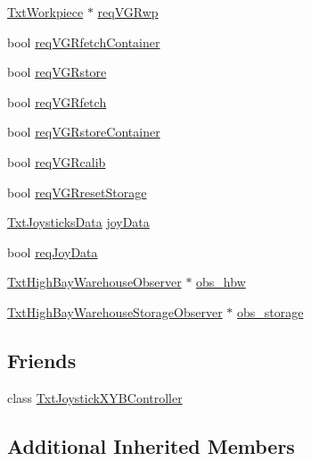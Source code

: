 \begin{DoxyCompactItemize}
\item 
\hyperlink{classft_1_1_txt_workpiece}{Txt\+Workpiece} $\ast$ \hyperlink{classft_1_1_txt_high_bay_warehouse_a75ccda2cc4ff08480f6b5d886e35d867}{req\+V\+G\+Rwp}
\item 
bool \hyperlink{classft_1_1_txt_high_bay_warehouse_a837761587b4c7873a28b757aa660f463}{req\+V\+G\+Rfetch\+Container}
\item 
bool \hyperlink{classft_1_1_txt_high_bay_warehouse_a2cf5cf9e6dd1cdf57a9082161798fbca}{req\+V\+G\+Rstore}
\item 
bool \hyperlink{classft_1_1_txt_high_bay_warehouse_a90e4e190386d912fb068bcc5bf033fd4}{req\+V\+G\+Rfetch}
\item 
bool \hyperlink{classft_1_1_txt_high_bay_warehouse_a34b88b73e4a10815a453debc756d8d0b}{req\+V\+G\+Rstore\+Container}
\item 
bool \hyperlink{classft_1_1_txt_high_bay_warehouse_a9dbb34e1a49f2835e07966fdb352f693}{req\+V\+G\+Rcalib}
\item 
bool \hyperlink{classft_1_1_txt_high_bay_warehouse_abe22fa14074fcc26c56aef48a6ffec0a}{req\+V\+G\+Rreset\+Storage}
\item 
\hyperlink{classft_1_1_txt_joysticks_data}{Txt\+Joysticks\+Data} \hyperlink{classft_1_1_txt_high_bay_warehouse_a9198fb21f8df14c39a42918c8f7fb229}{joy\+Data}
\item 
bool \hyperlink{classft_1_1_txt_high_bay_warehouse_a012b13872f28ba32973d0f4f8459243d}{req\+Joy\+Data}
\item 
\hyperlink{classft_1_1_txt_high_bay_warehouse_observer}{Txt\+High\+Bay\+Warehouse\+Observer} $\ast$ \hyperlink{classft_1_1_txt_high_bay_warehouse_abea430ced2afa416b2abaaea7b79ad43}{obs\+\_\+hbw}
\item 
\hyperlink{classft_1_1_txt_high_bay_warehouse_storage_observer}{Txt\+High\+Bay\+Warehouse\+Storage\+Observer} $\ast$ \hyperlink{classft_1_1_txt_high_bay_warehouse_af041aca8d94f924075cae8c7edb2eda2}{obs\+\_\+storage}
\end{DoxyCompactItemize}
\subsection*{Friends}
\begin{DoxyCompactItemize}
\item 
class \hyperlink{classft_1_1_txt_high_bay_warehouse_a23c350af40fe2a0866b409315c4dfe1a}{Txt\+Joystick\+X\+Y\+B\+Controller}
\end{DoxyCompactItemize}
\subsection*{Additional Inherited Members}


